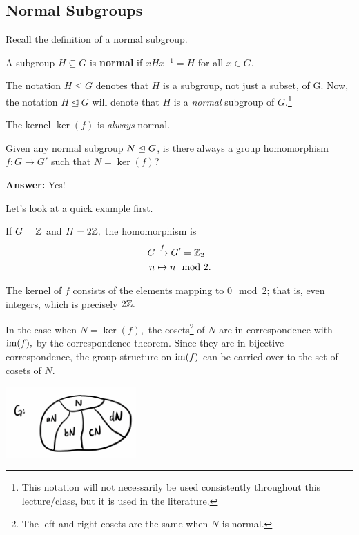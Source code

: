 \subsection{Normal Subgroups}

Recall the definition of a normal subgroup.
\begin{definition}
A subgroup $H \subseteq G$ is \textbf{normal} if $xHx^{-1}= H$ for all $x \in G.$
\end{definition}

The notation $H \leq G$ denotes that $H$ is a subgroup, not just a subset, of G. Now, the notation $H \trianglelefteq G$ will denote that $H$ is a \emph{normal} subgroup of $G.$\footnote{This notation will not necessarily be used consistently throughout this lecture/class, but it is used in the literature.}

\begin{example}[Kernel]
The kernel $\ker(f)$ is \emph{always} normal.
\end{example}

\begin{qq}
Given any normal subgroup $N \trianglelefteq G$, is there always a group homomorphism $f: G \rightarrow G'$ such that $N = \ker(f)$?

\textbf{Answer:} Yes!
\end{qq}

Let's look at a quick example first. 
\begin{example}
If $G = \mathbb Z$ and $H = 2\mathbb Z,$ the homomorphism is 
\begin{align*}
G &\xrightarrow{f} G' = \mathbb Z_2 \\
n &\mapsto n \mod 2.
\end{align*} 

The kernel of $f$ consists of the elements mapping to $0 \mod 2$; that is, even integers, which is precisely $2\mathbb Z.$ 
\end{example}

In the case when $N = \ker(f),$ the cosets\footnote{The left and right cosets are the same when $N$ is normal.} of $N$ are in correspondence with $\operatorname{im}(f),$ by the correspondence theorem. Since they are in bijective correspondence, the group structure on $\operatorname{im}(f)$ can be carried over to the set of cosets of $N.$


\begin{center}
\includegraphics[width = 5cm]{Lecture Files and Images/lec6-3.png}
\end{center}

